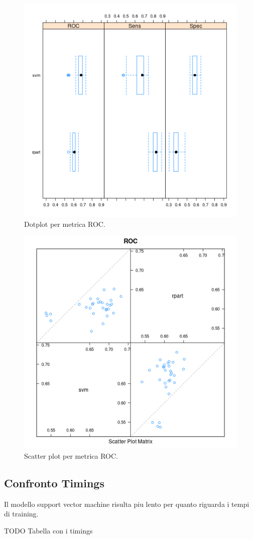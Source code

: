 \begin{figure}[H]
	\centering
	\includegraphics[width=13cm]{../images/compare_bw_plot_fix.png}
	\caption{Dotplot per metrica ROC.}
	\label{fig:compare_bw_plot}
\end{figure}

\begin{figure}[H]
	\centering
	\includegraphics[width=13cm]{../images/compare_splom_plot_fix.png}
	\caption{Scatter plot per metrica ROC.}
	\label{fig:compare_splom_plot}
\end{figure}

\subsection{Confronto Timings} Il modello support vector machine
risulta piu lento per quanto riguarda i tempi di training.

TODO
Tabella con i timings
